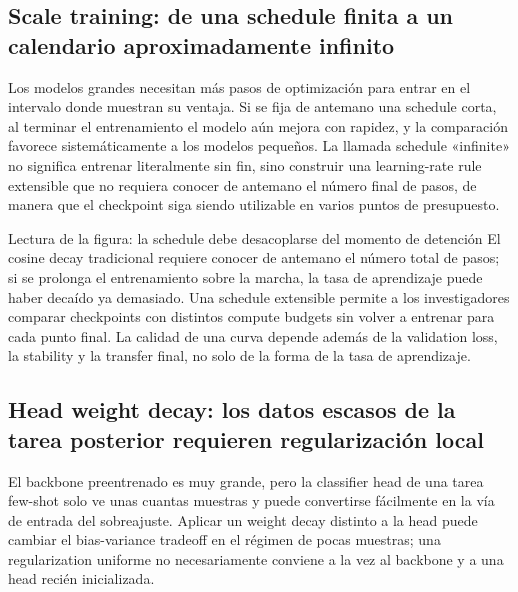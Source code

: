 \subsection{Scale training: de una schedule finita a un calendario aproximadamente infinito}

Los modelos grandes necesitan más pasos de optimización para entrar en el intervalo donde muestran su ventaja. Si se fija de antemano una schedule corta, al terminar el entrenamiento el modelo aún mejora con rapidez, y la comparación favorece sistemáticamente a los modelos pequeños. La llamada schedule «infinite» no significa entrenar literalmente sin fin, sino construir una learning-rate rule extensible que no requiera conocer de antemano el número final de pasos, de manera que el checkpoint siga siendo utilizable en varios puntos de presupuesto.


\begin{knowledgebox}{Lectura de la figura: la schedule debe desacoplarse del momento de detención}
El cosine decay tradicional requiere conocer de antemano el número total de pasos; si se prolonga el entrenamiento sobre la marcha, la tasa de aprendizaje puede haber decaído ya demasiado. Una schedule extensible permite a los investigadores comparar checkpoints con distintos compute budgets sin volver a entrenar para cada punto final. La calidad de una curva depende además de la validation loss, la stability y la transfer final, no solo de la forma de la tasa de aprendizaje.
\end{knowledgebox}


\subsection{Head weight decay: los datos escasos de la tarea posterior requieren regularización local}

El backbone preentrenado es muy grande, pero la classifier head de una tarea few-shot solo ve unas cuantas muestras y puede convertirse fácilmente en la vía de entrada del sobreajuste. Aplicar un weight decay distinto a la head puede cambiar el bias-variance tradeoff en el régimen de pocas muestras; una regularization uniforme no necesariamente conviene a la vez al backbone y a una head recién inicializada.

